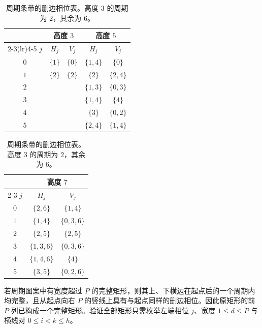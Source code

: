 \documentclass[UTF8,11pt,a4paper,fontset=none]{ctexart}
\theoremstyle{plain}
\theoremstyle{definition}
\begin{document}
\begin{table}[htbp]
\centering
\begin{tabular}{ccccc}
\toprule
 & \multicolumn{2}{c}{高度 \(3\)} & \multicolumn{2}{c}{高度 \(5\)} \\
\cmidrule(lr){2-3}\cmidrule(lr){4-5}
\(j\) & \(H_j\) & \(V_j\) & \(H_j\) & \(V_j\) \\
\midrule
\(0\) & \(\{1\}\) & \(\{0\}\) & \(\{1,4\}\) & \(\{0\}\) \\
\(1\) & \(\{2\}\) & \(\{2\}\) & \(\{2\}\) & \(\{2,4\}\) \\
\(2\) & & & \(\{1,3\}\) & \(\{0,3\}\) \\
\(3\) & & & \(\{1,4\}\) & \(\{4\}\) \\
\(4\) & & & \(\{3\}\) & \(\{0,2\}\) \\
\(5\) & & & \(\{2,4\}\) & \(\{1,4\}\) \\
\bottomrule
\end{tabular}
\qquad
\begin{tabular}{ccc}
\toprule
 & \multicolumn{2}{c}{高度 \(7\)}\\
\cmidrule(lr){2-3}
\(j\) & \(H_j\) & \(V_j\)\\
\midrule
\(0\) & \(\{2,6\}\) & \(\{1,4\}\)\\
\(1\) & \(\{1,4\}\) & \(\{0,3,6\}\)\\
\(2\) & \(\{2,5\}\) & \(\{2,5\}\)\\
\(3\) & \(\{1,3,6\}\) & \(\{0,3,6\}\)\\
\(4\) & \(\{1,4,6\}\) & \(\{4\}\)\\
\(5\) & \(\{3,5\}\) & \(\{0,2,6\}\)\\
\bottomrule
\end{tabular}
\caption{周期条带的删边相位表。高度 \(3\) 的周期为 \(2\)，其余为 \(6\)。}
\label{tab:phases}
\end{table}

若周期图案中有宽度超过 \(P\) 的完整矩形，则其上、下横边在起点后的一个周期内均完整，且从起点向右 \(P\) 的竖线上具有与起点同样的删边相位。因此原矩形的前 \(P\) 列已构成一个完整矩形。验证全部矩形只需枚举左端相位 \(j\)、宽度 \(1\le d\le P\) 与横线对 \(0\le i<k\le h\)。
\end{document}
